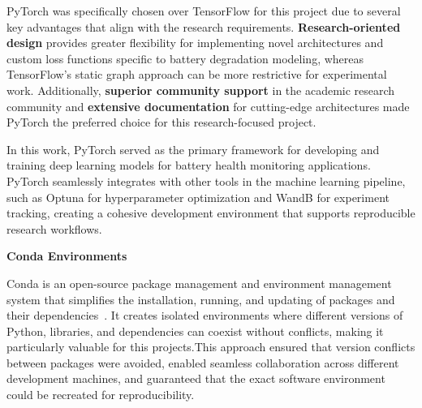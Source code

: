 PyTorch was specifically chosen over TensorFlow for this project due to several key advantages that align with the research requirements. \textbf{Research-oriented design} provides greater flexibility for implementing novel architectures and custom loss functions specific to battery degradation modeling, whereas TensorFlow's static graph approach can be more restrictive for experimental work. Additionally, \textbf{superior community support} in the academic research community and \textbf{extensive documentation} for cutting-edge architectures made PyTorch the preferred choice for this research-focused project.

In this work, PyTorch served as the primary framework for developing and training deep learning models for battery health monitoring applications. PyTorch seamlessly integrates with other tools in the machine learning pipeline, such as Optuna for hyperparameter optimization and WandB for experiment tracking, creating a cohesive development environment that supports reproducible research workflows.

\textbf{Conda Environments}

Conda is an open-source package management and environment management system that simplifies the installation, running, and updating of packages and 
their dependencies~\cite{conda_contributors_conda_2025}. It creates isolated environments where different versions of Python, libraries, 
and dependencies can coexist without conflicts, making it particularly valuable for this projects.This approach ensured that version conflicts between packages were avoided, enabled seamless collaboration across different 
development machines, and guaranteed that the exact software environment could be recreated for reproducibility.

